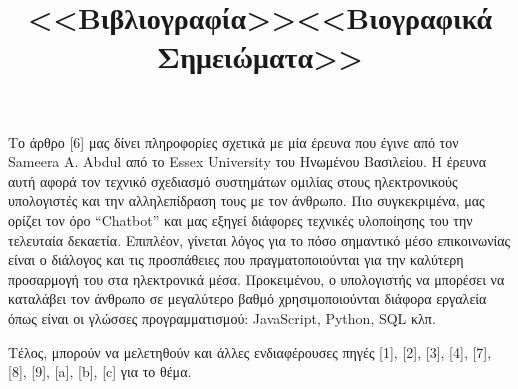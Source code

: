 \documentclass[12pt]{article}
\begin{document}
\begin{abstract*}
  Το άρθρο [6] μας δίνει πληροφορίες σχετικά με μία έρευνα που έγινε από τον Sameera A. Abdul από το Essex University του Ηνωμένου Βασιλείου. Η έρευνα αυτή αφορά τον τεχνικό σχεδιασμό συστημάτων ομιλίας στους ηλεκτρονικούς υπολογιστές και την αλληλεπίδραση τους με τον άνθρωπο. Πιο συγκεκριμένα, μας ορίζει τον όρο “Chatbot” 	και μας εξηγεί διάφορες τεχνικές υλοποίησης του την τελευταία δεκαετία. Επιπλέον, γίνεται λόγος για το πόσο σημαντικό μέσο επικοινωνίας είναι ο διάλογος και τις προσπάθειες που πραγματοποιούνται για την καλύτερη προσαρμογή του στα ηλεκτρονικά μέσα. Προκειμένου, ο υπολογιστής να μπορέσει να καταλάβει τον άνθρωπο σε μεγαλύτερο βαθμό χρησιμοποιούνται διάφορα εργαλεία όπως είναι οι γλώσσες προγραμματισμού: JavaScript, Python, SQL κλπ.
  
  Τέλος, μπορούν να μελετηθούν και άλλες ενδιαφέρουσες πηγές [1], [2], [3], [4], [7], [8], [9], [a], [b], [c] για το θέμα.
\end{abstract*}
\newpage

\begin{center}\LARGE{\title{\textbf{<<Βιβλιογραφία>>}}}\end{center}




\cite{simon1971human}
\cite{clark2019state}
\cite{simon1995artificial}
\cite{arefin2016exploring}
\cite{koelle2018acceptable}
\cite{rico2010usable}
\cite{abdul2015survey}
\cite{ferguson2012learning}
\cite{siemens2013learning}
\cite{koelle2019acceptable}
\cite{gavsevic2015let}
\cite{dillenbourg2002over}
\cite{dillenbourg2010technology}
\cite{feigenbaum2013hath}
\cite{rienties2016impact}
\cite{dillenbourg1999you}
\newpage

\begin{center}\LARGE{\title{\textbf{<<Βιογραφικά Σημειώματα>>}}}\end{center}
\end{document}
